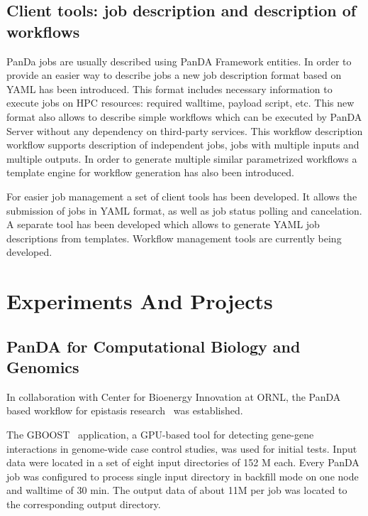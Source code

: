 \documentclass{webofc}
\begin{document}
\subsection{Client tools: job description and description of workflows}

PanDa jobs are usually described using PanDA Framework entities. In order to provide an easier way to describe jobs a new job description format based on YAML has been introduced. This format includes necessary information to execute jobs on HPC resources: required walltime, payload script, etc. This new format also allows to describe simple workflows which can be executed by PanDA Server without any dependency on third-party services. This workflow description workflow supports description of independent jobs, jobs with multiple inputs and multiple outputs. In order to generate multiple similar parametrized workflows a template engine for workflow generation has also been introduced.

For easier job management a set of client tools has been developed. It allows the submission of jobs in YAML format, as well as job status polling and cancelation. A separate tool has been developed which allows to generate YAML job descriptions from templates. Workflow management tools are currently being developed.



\section{Experiments And Projects}
\subsection{PanDA for Computational Biology and Genomics} \label{section_biology}

In collaboration with Center for Bioenergy Innovation at ORNL, the PanDA based workflow for epistasis research~\cite{Gros277} was established.


The GBOOST~\cite{GBOOST} application, a GPU-based tool for detecting gene-gene interactions in genome-wide case control studies, was used for initial tests. Input data were located in a set of eight input directories of 152 M each. Every PanDA job was configured to process single input directory in backfill mode on one node and walltime of 30 min. The output data of about 11M per job was located to the corresponding output directory.  
\end{document}
